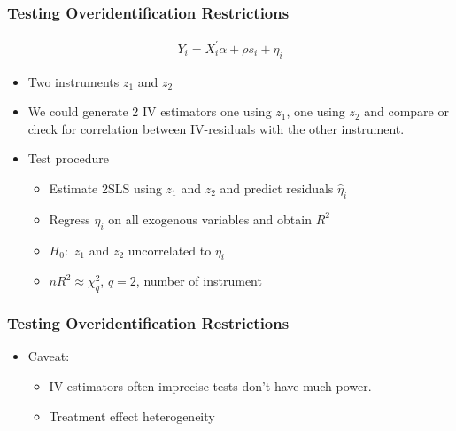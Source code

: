 \documentclass[pdftex]{beamer}
\begin{document}
\begin{frame}
\frametitle{Testing Overidentification Restrictions}

\begin{eqnarray*}
           Y_{i}= X_{i}^{'}\alpha+ \rho s_{i}+ \eta_{i}
      \end{eqnarray*}
\begin{itemize}
\item Two instruments $z_{1}$ and $z_{2}$
\item We could generate 2 IV estimators one using $z_{1}$, one using $z_{2}$ and compare or check for correlation between IV-residuals with the other instrument.
\item Test procedure

     \begin{itemize}
       \item Estimate 2SLS using $z_{1}$ and $z_{2}$ and predict residuals $\hat{\eta}_{i}$
       \item Regress $\hat{\eta}_{i}$ on all exogenous variables and obtain $R^{2}$
       \item $H_{0}:$ $z_{1}$ and $z_{2}$ uncorrelated to $\eta_i$
       \item $nR^{2}\approx\chi^{2}_{q}$, $q=2$, number of instrument
\end{itemize}
\end{itemize}

\end{frame}



\begin{frame}
\frametitle{Testing Overidentification Restrictions}
\begin{itemize}
\item Caveat:
      \begin{itemize}
      \item IV estimators often imprecise tests don't have much power.
      \item Treatment effect heterogeneity
      \end{itemize}


\end{itemize}
\end{frame}
\end{document}
